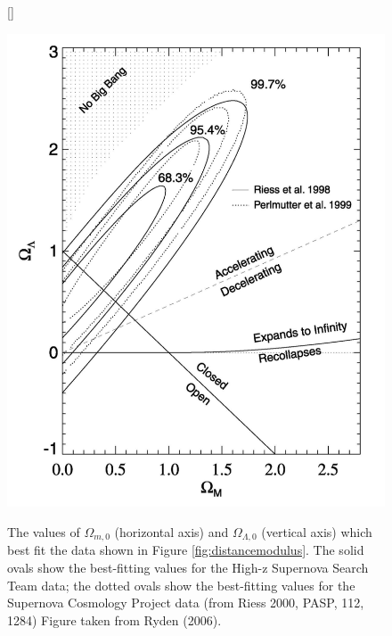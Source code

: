\documentclass[a4paper,11pt]{article}
\begin{document}
\begin{figure}[h]
    [\FBwidth]
    {\caption{\footnotesize{The values of $\Omega_{m,0}$ (horizontal axis) and $\Omega_{\Lambda,0}$ (vertical axis) which best fit the data shown in Figure \ref{fig:distancemodulus}. The solid ovals show the best-fitting values for the High-z Supernova Search Team data; the dotted ovals show the best-fitting values for the Supernova Cosmology Project data (from Riess 2000, PASP, 112, 1284) Figure taken from Ryden (2006).}}
    \label{fig:omegamodel}}
    {\includegraphics[width=12cm]{figures/OmegaModel.png}}
\end{figure}
\end{document}
